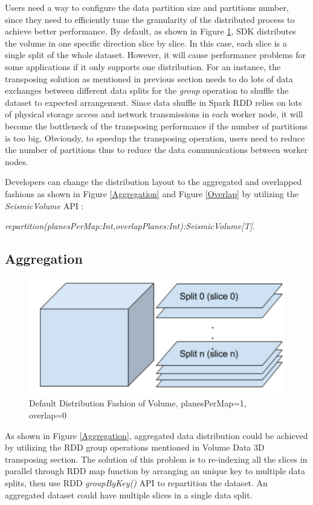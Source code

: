 Users need a way to configure the data partition size and partitions number, since they need to efficiently tune the granularity of the distributed process to achieve better performance. By default, as shown in Figure \ref{DefDist}, SDK distributes the volume in one specific direction slice by slice. In this case, each slice is a single split of the whole dataset. However, it will cause performance problems for some applications if it only supports one distribution. For an instance, the transposing solution as mentioned in previous section needs to do lots of data exchanges between different data splits for the \emph{group} operation to shuffle the dataset to expected arrangement. Since data shuffle in Spark RDD relies on lots of physical storage access and network transmissions in each worker node, it will become the bottleneck of the transposing performance if the number of partitions is too big. Obviously, to speedup the transposing operation, users need to reduce the number of partitions thus to reduce the data communications between worker nodes.

Developers can change the distribution layout to the aggregated and overlapped fashions as shown in Figure \ref{Aggregation} and Figure \ref{Overlap} by utilizing the \emph{SeismicVolume} API :

\emph{repartition(planesPerMap:Int,overlapPlanes:Int):SeismicVolume[T]}.


\subsection{Aggregation}

\begin{figure}[h]
\centering
\includegraphics[scale=0.6]{figures/DefDist.png}
\caption{Default Distribution Fashion of Volume, planesPerMap=1, overlap=0}
\label{DefDist}
\end{figure}

As shown in Figure \ref{Aggregation}, aggregated data distribution could be achieved by utilizing the RDD group operations mentioned in Volume Data 3D transposing section. The solution of this problem is to re-indexing all the slices in parallel through RDD map function by arranging an unique key to multiple data splits, then use RDD \emph{groupByKey()} API to repartition the dataset. An aggregated dataset could have multiple slices in a single data split.

